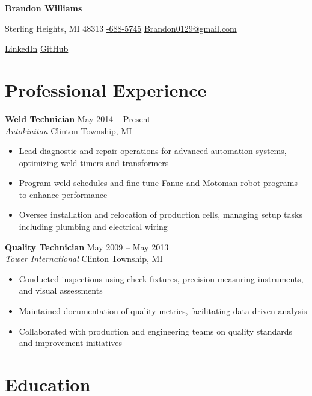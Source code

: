 \documentclass[11pt,letterpaper]{article}
\begin{document}
\begin{center}
{\Huge\textbf{Brandon Williams}}

\vspace{0.5em}
{\color{secondary}
Sterling Heights, MI 48313 \textbullet{} 
\href{tel:248-688-5745}{\faPhone{}-688-5745} \textbullet{} 
\href{mailto:Brandon0129@gmail.com}{\faEnvelope\space Brandon0129@gmail.com}

\href{https://linkedin.com/in/brandon-williams-00573a123}{\faLinkedin\space LinkedIn} \textbullet{} 
\href{https://github.com/BrandonWilliams129}{\faGithub\space GitHub}
}
\end{center}

\section*{Professional Experience}

\textbf{Weld Technician} \hfill May 2014 -- Present\\
\textit{Autokiniton} \textbullet{} Clinton Township, MI
\begin{itemize}
    \item Lead diagnostic and repair operations for advanced automation systems, optimizing weld timers and transformers
    \item Program weld schedules and fine-tune Fanuc and Motoman robot programs to enhance performance
    \item Oversee installation and relocation of production cells, managing setup tasks including plumbing and electrical wiring
\end{itemize}

\textbf{Quality Technician} \hfill May 2009 -- May 2013\\
\textit{Tower International} \textbullet{} Clinton Township, MI
\begin{itemize}
    \item Conducted inspections using check fixtures, precision measuring instruments, and visual assessments
    \item Maintained documentation of quality metrics, facilitating data-driven analysis
    \item Collaborated with production and engineering teams on quality standards and improvement initiatives
\end{itemize}

\section*{Education}
\end{document}
